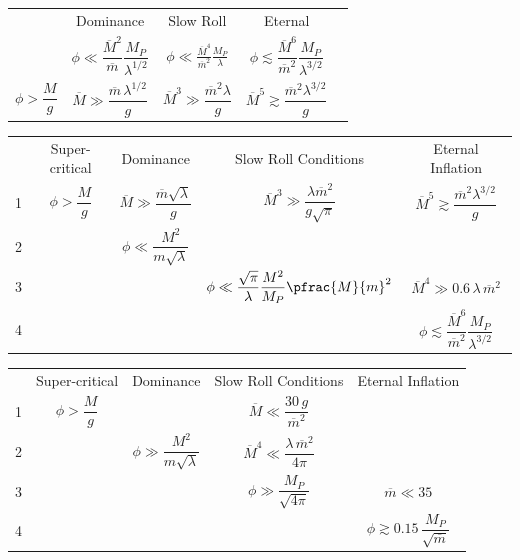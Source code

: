 

{ \def\arraystretch{2.5}
\begin{tabular}{ccccc}
  & Dominance & Slow Roll & Eternal \\
  & $\phi \ll \dfrac{\overline M^2}{\overline m} \dfrac{M_P}{\lambda^{1/2}}$ & $\displaystyle \phi \ll \frac{\overline M^4}{\overline m^2} \frac{M_P}{\lambda}$ & $ \phi \lesssim \dfrac{\overline M^6}{\overline m^2} \dfrac{M_P}{\lambda^{3/2}}$ \\
$\phi > \dfrac M g$ & $\overline M \gg \dfrac{\overline m \, \lambda^{1/2}}g$ & 
$ \overline M^3 \gg \dfrac{\overline m^2 \lambda}{g}$
& $ \overline M^5 \gtrsim \dfrac{\overline m^2 \lambda^{3/2}}{g}$ 
\end{tabular} }

{ \def\arraystretch{2.5}
\begin{tabular}{ccccc}
  & Super-critical & Dominance & Slow Roll Conditions & Eternal Inflation \\
1 & $\phi > \dfrac M g$ & $\overline M \gg \dfrac{\overline m \sqrt{\lambda}}g$ & 
$ \overline M^3 \gg \dfrac{\lambda \overline m^2}{g \sqrt{\pi}}$
& $ \overline M^5 \gtrsim \dfrac{\overline m^2 \lambda^{3/2}}{g}$ 
\\
2 & & $\phi \ll \dfrac{M^2}{m \sqrt{\lambda}}$ & & %
\\
3 & & & $\displaystyle \phi \ll \frac{\sqrt{\pi}}{\lambda} \frac{M^2}{M_P} \pfrac{M}{m}^2$
& $ \overline M^4 \gg 0.6 \, \lambda \, \overline m^2$ 
\\

4 & & & & $ \phi \lesssim \dfrac{\overline M^6}{\overline m^2} \dfrac{M_P}{\lambda^{3/2}}$
\end{tabular} }


{ \def\arraystretch{2.5}
\begin{tabular}{ccccc}
  & Super-critical & Dominance & Slow Roll Conditions & Eternal Inflation \\
1 & $\phi > \dfrac M g$ & & $\overline M \ll \dfrac{30 \, g}{\overline m^2}$ & $ $ 
\\
2 & & $\phi \gg \dfrac{M^2}{m \sqrt\lambda}$ & $\overline M^4 \ll \dfrac{\lambda \, \overline m^2}{4\pi}$
\\
3 & & & $ \phi \gg \dfrac{M_P}{\sqrt{4\pi}}$
& $ \overline m \ll 35 $ 
\\
4 & & & & $\phi \gtrsim 0.15 \, \dfrac{M_P}{\sqrt{\overline m}}$
\end{tabular} }



